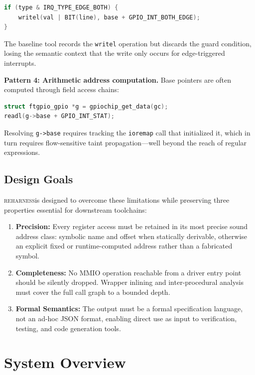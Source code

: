 \documentclass[sigconf,review]{acmart}
\newcommand{\reharness}{\textsc{reharness}}
\begin{document}
\begin{lstlisting}[language=C]
if (type & IRQ_TYPE_EDGE_BOTH) {
    writel(val | BIT(line), base + GPIO_INT_BOTH_EDGE);
}
\end{lstlisting}

The baseline tool records the \texttt{writel} operation but discards the guard condition, losing the semantic context that the write only occurs for edge-triggered interrupts.

\textbf{Pattern 4: Arithmetic address computation.} Base pointers are often computed through field access chains:

\begin{lstlisting}[language=C]
struct ftgpio_gpio *g = gpiochip_get_data(gc);
readl(g->base + GPIO_INT_STAT);
\end{lstlisting}

Resolving \texttt{g->base} requires tracking the \texttt{ioremap} call that initialized it, which in turn requires flow-sensitive taint propagation---well beyond the reach of regular expressions.

\subsection{Design Goals}

\reharness is designed to overcome these limitations while preserving three properties essential for downstream toolchains:

\begin{enumerate}
\item \textbf{Precision:} Every register access must be retained in its most precise sound address class: symbolic name and offset when statically derivable, otherwise an explicit fixed or runtime-computed address rather than a fabricated symbol.
\item \textbf{Completeness:} No MMIO operation reachable from a driver entry point should be silently dropped. Wrapper inlining and inter-procedural analysis must cover the full call graph to a bounded depth.
\item \textbf{Formal Semantics:} The output must be a formal specification language, not an ad-hoc JSON format, enabling direct use as input to verification, testing, and code generation tools.
\end{enumerate}

\section{System Overview}
\end{document}
